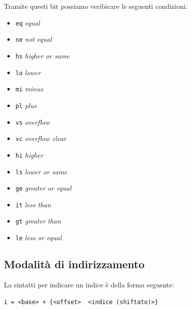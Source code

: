 Tramite questi bit possiamo veribicare le seguenti condizioni:
\begin{itemize}
	\item \verb|eq| \textit{equal}
	\item \verb|ne| \textit{not equal}
	\item \verb|hs| \textit{higher or same}
	\item \verb|lo| \textit{lower}
	\item \verb|mi| \textit{minus}
	\item \verb|pl| \textit{plus}
	\item \verb|vs| \textit{overflow}
	\item \verb|vc| \textit{overflow clear}
	\item \verb|hi| \textit{higher}
	\item \verb|ls| \textit{lower or same}
	\item \verb|ge| \textit{greater or equal}
	\item \verb|it| \textit{less than}
	\item \verb|gt| \textit{greater than}
	\item \verb|le| \textit{less or equal}
\end{itemize}
\subsection{Modalità di indirizzamento}
La sintatti per indicare un indice è della forma seguente:
\begin{center}
	\verb|i = <base> + {<offset>  <indice (shiftato)>}|
\end{center}
